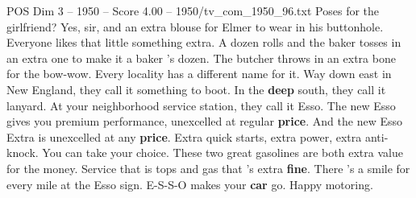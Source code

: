\begin{textsample}{POS Dim 3 – 1950 – Score 4.00 – 1950/tv\_com\_1950\_96.txt}  \label{ex:f3_pos_011}
Poses for the girlfriend?
Yes, sir, and an extra blouse for Elmer to wear in his buttonhole.
Everyone likes that little something extra.
A dozen rolls and the baker tosses in an extra one to make it a baker 's dozen.
The butcher throws in an extra bone for the bow-wow.
Every locality has a different name for it.
Way down east in New England, they call it something to boot.
In the \textbf{deep} south, they call it lanyard.
At your neighborhood service station, they call it Esso.
The new Esso gives you premium performance, unexcelled at regular \textbf{price}.
And the new Esso Extra is unexcelled at any \textbf{price}.
Extra quick starts, extra power, extra anti-knock.
You can take your choice.
These two great gasolines are both extra value for the money.
Service that is tops and gas that 's extra \textbf{fine}.
There 's a smile for every mile at the Esso sign.
E-S-S-O makes your \textbf{car} go.
Happy motoring.

\end{textsample}
